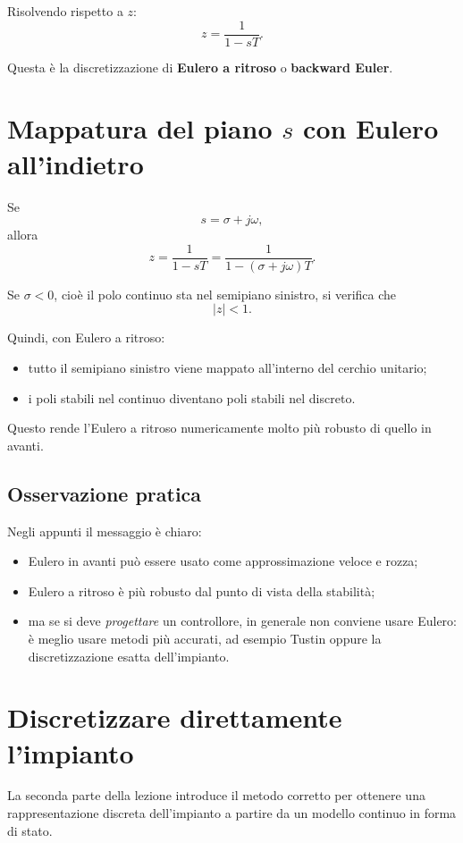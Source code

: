 Risolvendo rispetto a \(z\):
\[
z=\frac{1}{1-sT}.
\]

Questa \`e la discretizzazione di \textbf{Eulero a ritroso} o \textbf{backward Euler}.

\section{Mappatura del piano \(s\) con Eulero all'indietro}

Se
\[
s=\sigma+j\omega,
\]
allora
\[
z=\frac{1}{1-sT}
=
\frac{1}{1-(\sigma+j\omega)T}.
\]

Se \(\sigma<0\), cio\`e il polo continuo sta nel semipiano sinistro,
si verifica che
\[
|z|<1.
\]

Quindi, con Eulero a ritroso:
\begin{itemize}
    \item tutto il semipiano sinistro viene mappato all'interno del cerchio unitario;
    \item i poli stabili nel continuo diventano poli stabili nel discreto.
\end{itemize}

Questo rende l'Eulero a ritroso numericamente molto pi\`u robusto di quello in avanti.

\subsection*{Osservazione pratica}

Negli appunti il messaggio \`e chiaro:
\begin{itemize}
    \item Eulero in avanti pu\`o essere usato come approssimazione veloce e rozza;
    \item Eulero a ritroso \`e pi\`u robusto dal punto di vista della stabilit\`a;
    \item ma se si deve \emph{progettare} un controllore, in generale non conviene usare Eulero:
    \`e meglio usare metodi pi\`u accurati, ad esempio Tustin oppure la discretizzazione esatta dell'impianto.
\end{itemize}

\section{Discretizzare direttamente l'impianto}

La seconda parte della lezione introduce il metodo corretto per ottenere
una rappresentazione discreta dell'impianto a partire da un modello continuo in forma di stato.

